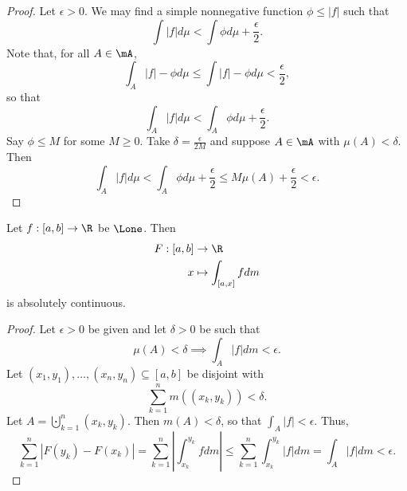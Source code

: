 \documentclass[pmath451]{subfiles}
\begin{document}
    \begin{proof}
        Let $\epsilon>0$. We may find a simple nonnegative function $\phi\leq\left| f \right|$ such that
        \begin{equation*}
            \int \left| f \right|d\mu < \int\phi d\mu + \frac{\epsilon}{2}.
        \end{equation*} 
        Note that, for all $A\in\mA$,
        \begin{equation*}
            \int^{}_{A}\left| f \right|-\phi d\mu \leq \int\left| f \right|-\phi d\mu < \frac{\epsilon}{2},
        \end{equation*}
        so that
        \begin{equation*}
            \int_A\left| f \right|d\mu < \int_A\phi d\mu + \frac{\epsilon}{2}.
        \end{equation*}
        Say $\phi\leq M$ for some $M\geq 0$. Take $\delta = \frac{\epsilon}{2M}$ and suppose $A\in\mA$ with $\mu\left( A \right)<\delta$. Then
        \begin{equation*}
            \int_A\left| f \right|d\mu < \int_A\phi d\mu + \frac{\epsilon}{2} \leq M\mu\left( A \right)+\frac{\epsilon}{2} < \epsilon.
        \end{equation*}
    \end{proof}
    
    \begin{cor}{}
        Let $f:\left[ a,b \right]\to\R$ be $\Lone$. Then
        \begin{equation*}
            \begin{aligned}
                F:\left[ a,b \right]&\to\R \\
                x&\mapsto\int_{\left[ a,x \right]}fdm
            \end{aligned} 
        \end{equation*}
        is absolutely continuous.
    \end{cor}	

    \begin{proof}
        Let $\epsilon>0$ be given and let $\delta>0$ be such that
        \begin{equation*}
            \mu\left( A \right)<\delta \implies \int^{}_{A}\left| f \right|dm < \epsilon.
        \end{equation*}
        Let $\left( x_1,y_1 \right),\ldots,\left( x_n,y_n \right)\subseteq\left[ a,b \right]$ be disjoint with
        \begin{equation*}
            \sum^{n}_{k=1} m\left( \left( x_k,y_k \right) \right) < \delta.
        \end{equation*}
        Let $A = \bigcupdot^{n}_{k=1}\left( x_k,y_k \right)$. Then $m\left( A \right) < \delta$, so that $\int_A\left| f \right|<\epsilon$. Thus,
        \begin{equation*}
            \sum^{n}_{k=1} \left| F\left( y_k \right)-F\left( x_k \right) \right| = \sum^{n}_{k=1} \left| \int^{y_k}_{x_k}fdm \right| \leq \sum^{n}_{k=1} \int^{y_k}_{x_k}\left| f \right|dm = \int^{}_{A}\left| f \right|dm < \epsilon.
        \end{equation*}
    \end{proof}
    
\end{document}
